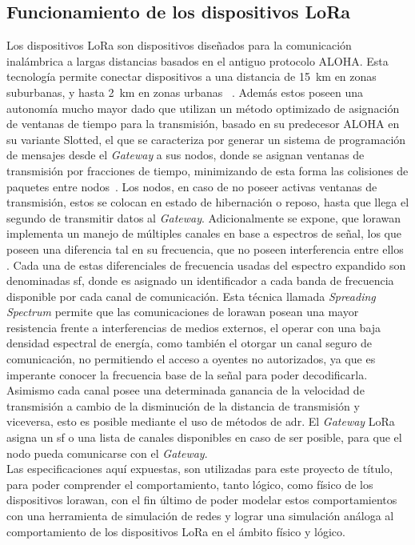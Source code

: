 \begin{justify}
\section{Funcionamiento de los dispositivos LoRa}
Los dispositivos LoRa son dispositivos diseñados para la comunicación inalámbrica a largas distancias basados en el antiguo protocolo ALOHA. Esta tecnología permite conectar dispositivos a una distancia de \SI{15}{\kilo\meter} en zonas suburbanas, y hasta \SI{2}{\kilo\meter} en zonas urbanas \cite{Sornin}~\cite{Sornin2}. Además estos poseen una autonomía mucho mayor dado que utilizan un método optimizado de asignación de ventanas de tiempo para la transmisión, basado en su predecesor ALOHA en su variante Slotted, el que se caracteriza por generar un sistema de programación de mensajes desde el \textit{Gateway} a sus nodos, donde se asignan ventanas de transmisión por fracciones de tiempo, minimizando de esta forma las colisiones de paquetes entre nodos~\cite{NORMAN}. Los nodos, en caso de no poseer activas ventanas de transmisión, estos se colocan en estado de hibernación o reposo, hasta que llega el segundo de transmitir datos al \textit{Gateway}. Adicionalmente se expone, que \gls{lorawan} implementa un manejo de múltiples canales en base a espectros de señal, los que poseen una diferencia tal en su frecuencia, que no poseen interferencia entre ellos \cite{modulation}. Cada una de estas diferenciales de frecuencia usadas del espectro expandido son denominadas \gls{sf}, donde es asignado un identificador a cada banda de frecuencia disponible por cada canal de comunicación. Esta técnica llamada \textit{Spreading Spectrum} permite que las comunicaciones de \gls{lorawan} posean una mayor resistencia frente a interferencias de medios externos, el operar con una baja densidad espectral de energía, como también el otorgar un canal seguro de comunicación, no permitiendo el acceso a oyentes no autorizados, ya que es imperante conocer la frecuencia base de la señal para poder decodificarla. Asimismo cada canal posee una determinada ganancia de la velocidad de transmisión a cambio de la disminución de la distancia de transmisión y viceversa, esto es posible mediante el uso de métodos de \gls{adr}. El \textit{Gateway} LoRa asigna un \gls{sf} o una lista de canales disponibles en caso de ser posible, para que el nodo pueda comunicarse con el \textit{Gateway}.\\
Las especificaciones aquí expuestas, son utilizadas para este proyecto de título, para poder comprender el comportamiento, tanto lógico, como físico de los dispositivos \gls{lorawan}, con el fin último de poder modelar estos comportamientos con una herramienta de simulación de redes y lograr una simulación análoga al comportamiento de los dispositivos LoRa en el ámbito físico y lógico.


\end{justify}
